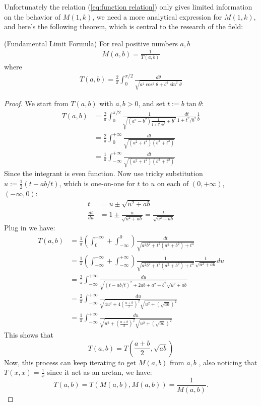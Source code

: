 \documentclass{report}
\begin{document}
\begin{titlepage}
Unfortunately the relation (\ref{eq:function relation}) only gives limited information on the behavior of $M(1,k)$, we need a more analytical expression for $M(1,k)$, and here's the following theorem, which is central to the research of the field:
\begin{T}{\rm(Fundamental Limit Formula)\cite{Borwein:1987aa}\cite{Wernicke:1904aa}}
For real positive numbers $a,b$
\begin{align}
M(a,b)=\frac{1}{T(a,b)}
\end{align}
where
\begin{align}
T(a,b)=\frac{2}{\pi}\int_0^{\pi/2}\frac{d\theta}{\sqrt{a^2\cos^2\theta+b^2\sin^2\theta}}
\end{align}
\end{T}
\begin{proof}\cite{Borwein:1987aa}
 We start from $T(a,b)$ with $a,b>0$, and set $t:=b\tan\theta$:
\begin{align*}
T(a,b)&=\frac{2}{\pi}\int_0^{\pi/2}\frac{1}{\sqrt{(a^2-b^2)\frac{1}{1+t^2/b^2}+b^2}}\frac{dt}{1+t^2/b^2}\frac{1}{b} \\
&=\frac{2}{\pi}\int_0^{+\infty}\frac{dt}{\sqrt{(a^2+t^2)(b^2+t^2)}}\\
&=\frac{1}{\pi}\int_{-\infty}^{+\infty}\frac{dt}{\sqrt{(a^2+t^2)(b^2+t^2)}}
\end{align*}
Since the integrant is even function.
Now use tricky substitution $u:=\frac{1}{2}(t-ab/t)$, which is one-on-one for $t$ to $u$ on each of $(0,+\infty)$, $(-\infty,0)$:
\begin{align*}
t&=u\pm\sqrt{u^2+ab}\\
\frac{dt}{du}&=1\pm\frac{u}{\sqrt{u^2+ab}}=\frac{t}{\sqrt{u^2+ab}}
\end{align*}
Plug in we have:
\begin{align*}
T(a,b)&=\frac{1}{\pi}\left(\int_{0}^{+\infty}+\int_{-\infty}^{0}\right)\frac{dt}{\sqrt{a^2b^2+t^2(a^2+b^2)+t^4}}\\
&=\frac{1}{\pi}\left(\int_{-\infty}^{+\infty}+\int_{-\infty}^{+\infty}\right)\frac{1}{\sqrt{a^2b^2+t^2(a^2+b^2)+t^4}}\frac{t}{\sqrt{u^2+ab}}du\\
&=\frac{2}{\pi}\int_{-\infty}^{+\infty}\frac{du}{\sqrt{\left(t-ab/t\right)^2+2ab+a^2+b^2}\sqrt{u^2+ab}}\\
&=\frac{2}{\pi}\int_{-\infty}^{+\infty}\frac{du}{\sqrt{4u^2+4\left(\frac{a+b}{2}\right)^2}\sqrt{u^2+(\sqrt{ab})^2}}\\
&=\frac{1}{\pi}\int_{-\infty}^{+\infty}\frac{du}{\sqrt{u^2+\left(\frac{a+b}{2}\right)^2}\sqrt{u^2+(\sqrt{ab})^2}}
\end{align*}
This shows that 
\[
T(a,b)=T\left(\frac{a+b}{2},\sqrt{ab}\right)
\]
Now, this process can keep iterating to get $M(a,b)$ from $a,b$ , also noticing that $T(x,x)=\frac{1}{x}$ since it act as an arctan, we have:
\[
T(a,b)=T(M(a,b),M(a,b))=\frac{1}{M(a,b)}.
\]
\end{proof}


\end{titlepage}
\end{document}
